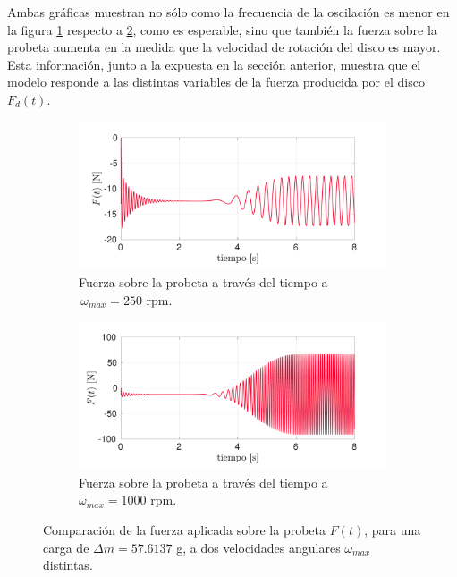 Ambas gráficas muestran no sólo como la frecuencia de la oscilación es menor en la figura \ref{fig:f_w250} respecto a \ref{fig:f_w1000}, como es esperable, sino que también la fuerza sobre la probeta aumenta en la medida que la velocidad de rotación del disco es mayor. Esta información, junto a la expuesta en la sección anterior, muestra que el modelo responde a las distintas variables de la fuerza producida por el disco $F_d(t)$. 

\begin{figure}[p]
\centering
	\begin{subfigure}{1\linewidth}
		\centering
		\includegraphics[width=\linewidth, trim={0cm 0cm 2cm 0cm},clip]{Imagenes/f_w250.pdf}
		\caption{Fuerza sobre la probeta a través del tiempo a $\,\omega_{max}=250$ rpm.}
		\label{fig:f_w250}
	\end{subfigure}
	\begin{subfigure}{1\linewidth}
		\centering
		\includegraphics[width=\linewidth, trim={0cm 0cm 2cm 0cm},clip]{Imagenes/f_w1000.pdf}
		\caption{Fuerza sobre la probeta a través del tiempo a $\omega_{max}=1000$ rpm.}
		\label{fig:f_w1000}
	\end{subfigure}
\caption{Comparación de la fuerza aplicada sobre la probeta $F(t)$, para una carga de $\Delta m = 57.6137$ g, a dos velocidades angulares $\omega_{max}$ distintas.}
\label{fig:f_w520}
\end{figure}

